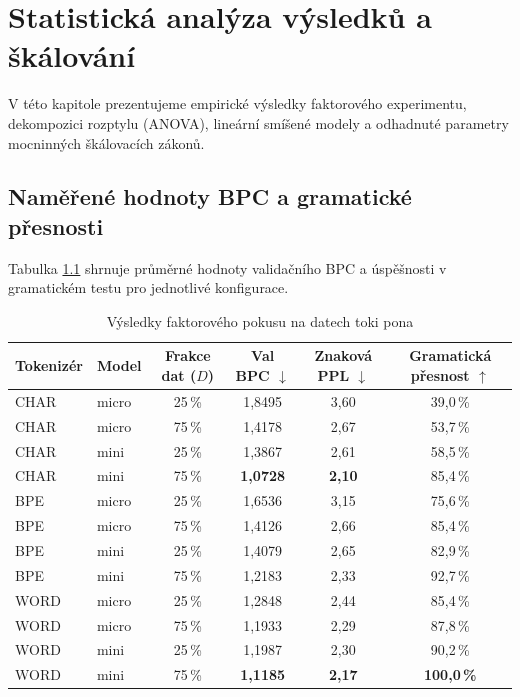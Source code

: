 \chapter{Statistická analýza výsledků a škálování}
\label{chap:vysledky}

V této kapitole prezentujeme empirické výsledky faktorového experimentu, dekompozici rozptylu (ANOVA), lineární smíšené modely a odhadnuté parametry mocninných škálovacích zákonů.

\section{Naměřené hodnoty BPC a gramatické přesnosti}
Tabulka \ref{tab:vysledky_grid} shrnuje průměrné hodnoty validačního BPC a úspěšnosti v gramatickém testu pro jednotlivé konfigurace.

\begin{table}[htbp]
    \centering
    \caption{Výsledky faktorového pokusu na datech toki pona}
    \label{tab:vysledky_grid}
    \begin{tabular}{llcccc}
        \toprule
        Tokenizér & Model & Frakce dat ($D$) & Val BPC $\downarrow$ & Znaková PPL $\downarrow$ & Gramatická přesnost $\uparrow$ \\
        \midrule
        CHAR & micro & 25\,\% & 1{,}8495 & 3{,}60 & 39{,}0\,\% \\
        CHAR & micro & 75\,\% & 1{,}4178 & 2{,}67 & 53{,}7\,\% \\
        CHAR & mini  & 25\,\% & 1{,}3867 & 2{,}61 & 58{,}5\,\% \\
        CHAR & mini  & 75\,\% & \textbf{1{,}0728} & \textbf{2{,}10} & 85{,}4\,\% \\
        \midrule
        BPE  & micro & 25\,\% & 1{,}6536 & 3{,}15 & 75{,}6\,\% \\
        BPE  & micro & 75\,\% & 1{,}4126 & 2{,}66 & 85{,}4\,\% \\
        BPE  & mini  & 25\,\% & 1{,}4079 & 2{,}65 & 82{,}9\,\% \\
        BPE  & mini  & 75\,\% & 1{,}2183 & 2{,}33 & 92{,}7\,\% \\
        \midrule
        WORD & micro & 25\,\% & 1{,}2848 & 2{,}44 & 85{,}4\,\% \\
        WORD & micro & 75\,\% & 1{,}1933 & 2{,}29 & 87{,}8\,\% \\
        WORD & mini  & 25\,\% & 1{,}1987 & 2{,}30 & 90{,}2\,\% \\
        WORD & mini  & 75\,\% & \textbf{1{,}1185} & \textbf{2{,}17} & \textbf{100{,}0\,\%} \\
        \bottomrule
    \end{tabular}
\end{table}


